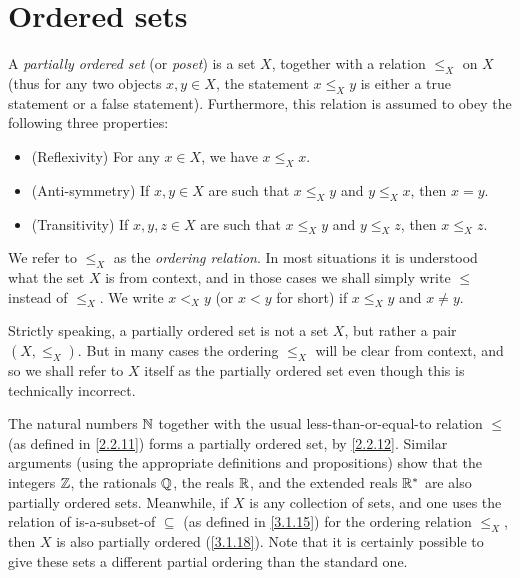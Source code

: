 \section{Ordered sets}\label{sec:8.5}

\begin{defn}\label{8.5.1}
  A \emph{partially ordered set} (or \emph{poset}) is a set \(X\), together with a relation \(\leq_X\) on \(X\)
  (thus for any two objects \(x, y \in X\), the statement \(x \leq_X y\) is either a true statement or a false statement).
  Furthermore, this relation is assumed to obey the following three properties:
  \begin{itemize}
    \item (Reflexivity) For any \(x \in X\), we have \(x \leq_X x\).
    \item (Anti-symmetry) If \(x, y \in X\) are such that \(x \leq_X y\) and \(y \leq_X x\), then \(x = y\).
    \item (Transitivity) If \(x, y, z \in X\) are such that \(x \leq_X y\) and \(y \leq_X z\), then \(x \leq_X z\).
  \end{itemize}
  We refer to \(\leq_X\) as the \emph{ordering relation}.
  In most situations it is understood what the set \(X\) is from context, and in those cases we shall simply write \(\leq\) instead of \(\leq_X\).
  We write \(x <_X y\) (or \(x < y\) for short) if \(x \leq_X y\) and \(x \neq y\).
\end{defn}

\begin{note}
  Strictly speaking, a partially ordered set is not a set \(X\), but rather a pair \((X, \leq_X)\).
  But in many cases the ordering \(\leq_X\) will be clear from context, and so we shall refer to \(X\) itself as the partially ordered set even though this is technically incorrect.
\end{note}

\begin{eg}\label{8.5.2}
  The natural numbers \(\mathbb{N}\) together with the usual less-than-or-equal-to relation \(\leq\) (as defined in \cref{2.2.11}) forms a partially ordered set, by \cref{2.2.12}.
  Similar arguments (using the appropriate definitions and propositions) show that the integers \(\mathbb{Z}\), the rationals \(\mathbb{Q}\), the reals \(\mathbb{R}\), and the extended reals \(\mathbb{R}^*\) are also partially ordered sets.
  Meanwhile, if \(X\) is any collection of sets, and one uses the relation of is-a-subset-of \(\subseteq\) (as defined in \cref{3.1.15}) for the ordering relation \(\leq_X\), then \(X\) is also partially ordered (\cref{3.1.18}).
  Note that it is certainly possible to give these sets a different partial ordering than the standard one.
\end{eg}

